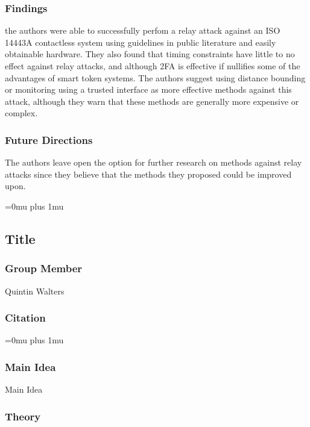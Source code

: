 \subsubsection{Findings}

\noindent
the authors were able to successfully perfom a relay attack against an ISO 14443A contactless system using guidelines in public literature and easily obtainable hardware. They also found that timing constraints have little to no effect against relay attacks, and although 2FA is effective if nullifies some of the advantages of smart token systems. The authors suggest using distance bounding or monitoring using a trusted interface as more effective methods against this attack, although they warn that these methods are generally more expensive or complex. 

\subsubsection{Future Directions}

\noindent
The authors leave open the option for further research on methods against relay attacks since they believe that the methods they proposed could be improved upon.

\Urlmuskip=0mu plus 1mu\relax

\noindent
\subsection{Title}

\subsubsection{Group Member}

\noindent
Quintin Walters

\noindent
\subsubsection{Citation}

\Urlmuskip=0mu plus 1mu\relax

\subsubsection{Main Idea}

\noindent
Main Idea

\subsubsection{Theory}

